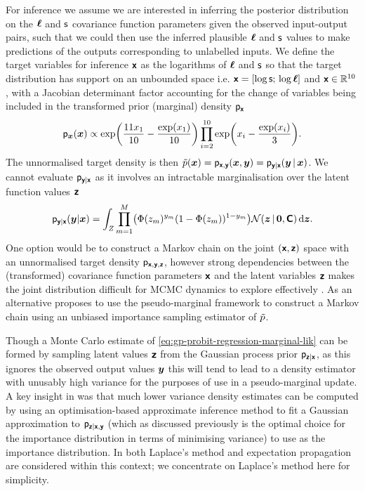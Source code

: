 For inference we assume we are interested in inferring the posterior distribution on the $\boldsymbol{\mathsf{\ell}}$ and $\mathsf{s}$ covariance function parameters given the observed input-output pairs, such that we could then use the inferred plausible $\boldsymbol{\mathsf{\ell}}$ and $\mathsf{s}$ values to make predictions of the outputs corresponding to unlabelled inputs. We define the target variables for inference $\boldsymbol{\mathsf{x}}$ as the logarithms of $\boldsymbol{\mathsf{\ell}}$ and $\mathsf{s}$ so that the target distribution has support on an unbounded space i.e. $\boldsymbol{\mathsf{x}} = [\log\mathsf{s};\,\log\boldsymbol{\mathsf{\ell}}]$ and $\boldsymbol{\mathsf{x}} \in \mathbb{R}^{10}$, with a Jacobian determinant factor accounting for the change of variables being included in the transformed prior (marginal) density $\mathsf{p}_{\boldsymbol{\mathsf{x}}}$
\begin{equation}\label{eq:gp-model-target-prior}
  \pden{\vct{x}}(\vct{x}) \propto 
  \exp\lpa\frac{11 x_1}{10} -\frac{\exp(x_1)}{10}\rpa \prod_{i=2}^{10} \exp\lpa x_i -\frac{\exp(x_i)}{3}\rpa.
\end{equation}
The unnormalised target density is then $\tilde{p}(\boldsymbol{x}) = \mathsf{p}_{\boldsymbol{\mathsf{x}},\boldsymbol{\mathsf{y}}}(\boldsymbol{x},\boldsymbol{y}) = \mathsf{p}_{\boldsymbol{\mathsf{y}}|\boldsymbol{\mathsf{x}}}(\boldsymbol{y}\operatorname{|}\boldsymbol{x})$. We cannot evaluate $\mathsf{p}_{\boldsymbol{\mathsf{y}}|\boldsymbol{\mathsf{x}}}$ as it involves an intractable marginalisation over the latent function values $\boldsymbol{\mathsf{z}}$
\begin{equation}\label{eq:gp-probit-regression-marginal-lik}
\begin{split}
  \pden{\rvct{y}|\rvct{x}}(\vct{y}|\vct{x}) =
  \int_{\set{Z}} 
    \prod_{m=1}^M\lpa \Phi(z_m)^{y_m} (1 - \Phi(z_m))^{1-y_m} \rpa
    \nrm{\vct{z} \gvn \vct{0}, \rvct{C}}
  \,\dr\vct{z}.
\end{split}
\end{equation}
One option would be to construct a Markov chain on the joint $(\boldsymbol{\mathsf{x}},\boldsymbol{\mathsf{z}})$ space with an unnormalised target density $\mathsf{p}_{\boldsymbol{\mathsf{x}},\boldsymbol{\mathsf{y}},\boldsymbol{\mathsf{z}}}$, however strong dependencies between the (transformed) covariance function parameters $\boldsymbol{\mathsf{x}}$ and the latent variables $\boldsymbol{\mathsf{z}}$ makes the joint distribution difficult for \ac{MCMC} dynamics to explore effectively \citep{filippone2014pseudo}. As an alternative \citep{filippone2014pseudo} proposes to use the pseudo-marginal framework to construct a Markov chain using an unbiased importance sampling estimator of $\tilde{p}$.

Though a Monte Carlo estimate of \eqref{eq:gp-probit-regression-marginal-lik} can be formed by sampling latent values $\boldsymbol{\mathsf{z}}$ from the Gaussian process prior $\mathsf{p}_{\boldsymbol{\mathsf{z}}|\boldsymbol{\mathsf{x}}}$, as this ignores the observed output values $\boldsymbol{y}$ this will tend to lead to a density estimator with unusably high variance for the purposes of use in a pseudo-marginal update. A key insight in \citep{filippone2014pseudo} was that much lower variance density estimates can be computed by using an optimisation-based approximate inference method to fit a Gaussian approximation to $\mathsf{p}_{\boldsymbol{\mathsf{z}}|\boldsymbol{\mathsf{x}},\boldsymbol{\mathsf{y}}}$ (which as discussed previously is the optimal choice for the importance distribution in terms of minimising variance) to use as the importance distribution. In \citep{filippone2014pseudo} both Laplace's method and expectation propagation are considered within this context; we concentrate on Laplace's method here for simplicity.


